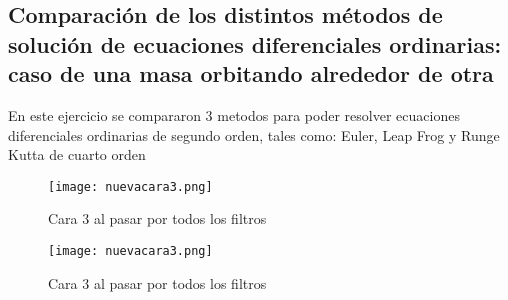 \documentclass[a4paper]{article}
\begin{document}
\subsection{Comparación de los distintos métodos de solución de ecuaciones diferenciales ordinarias: caso de una masa orbitando alrededor de otra}
En este ejercicio se compararon 3 metodos para poder resolver ecuaciones diferenciales ordinarias de segundo orden, tales como: Euler, Leap Frog y Runge Kutta de cuarto orden 

\begin{figure}[H]
\texttt{[image: nuevacara3.png]}
\caption{Cara 3 al pasar por todos los filtros}
\centering
\end{figure}

\begin{figure}[H]
\texttt{[image: nuevacara3.png]}
\caption{Cara 3 al pasar por todos los filtros}
\centering
\end{figure}
\end{document}
